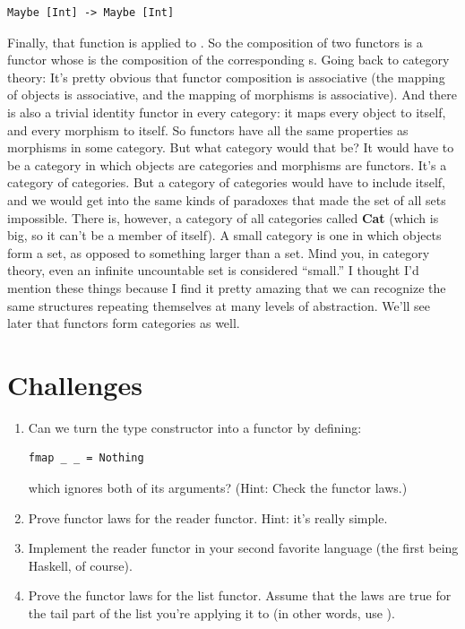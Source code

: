 \begin{verbatim}
Maybe [Int] -> Maybe [Int]
\end{verbatim}
Finally, that function is applied to . So the composition of
two functors is a functor whose  is the composition of the
corresponding s. Going back to category theory: It's pretty
obvious that functor composition is associative (the mapping of objects
is associative, and the mapping of morphisms is associative). And there
is also a trivial identity functor in every category: it maps every
object to itself, and every morphism to itself. So functors have all the
same properties as morphisms in some category. But what category would
that be? It would have to be a category in which objects are categories
and morphisms are functors. It's a category of categories. But a
category of  categories would have to include itself, and we
would get into the same kinds of paradoxes that made the set of all sets
impossible. There is, however, a category of all  categories
called \textbf{Cat} (which is big, so it can't be a member of itself). A
small category is one in which objects form a set, as opposed to
something larger than a set. Mind you, in category theory, even an
infinite uncountable set is considered ``small.'' I thought I'd mention
these things because I find it pretty amazing that we can recognize the
same structures repeating themselves at many levels of abstraction.
We'll see later that functors form categories as well.

\section{Challenges}\label{challenges}

\begin{enumerate}
  \tightlist
\item
  Can we turn the  type constructor into a functor by
  defining:

\begin{verbatim}
fmap _ _ = Nothing
\end{verbatim}

  which ignores both of its arguments? (Hint: Check the functor laws.)
\item
  Prove functor laws for the reader functor. Hint: it's really simple.
\item
  Implement the reader functor in your second favorite language (the
  first being Haskell, of course).
\item
  Prove the functor laws for the list functor. Assume that the laws are
  true for the tail part of the list you're applying it to (in other
  words, use ).
\end{enumerate}